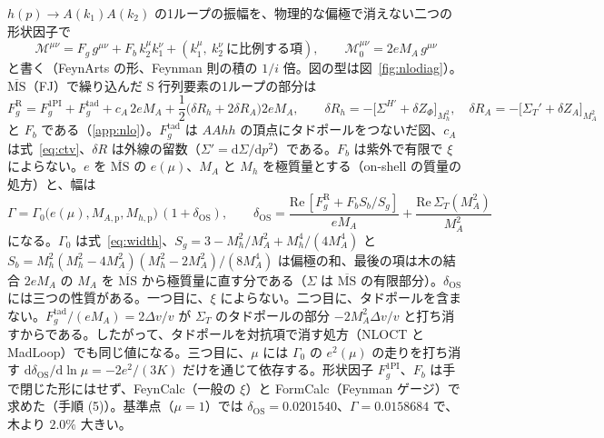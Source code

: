 \documentclass[a4paper,10pt]{ltjsarticle}
\newcommand{\dd}{\mathrm{d}}
\newcommand{\MSbar}{\overline{\mathrm{MS}}}
\newcommand{\re}{\mathrm{Re}\,}
\begin{document}
$h(p)\to A(k_1)A(k_2)$ の1ループの振幅を、物理的な偏極で消えない二つの形状因子で
\begin{equation}
\mathcal M^{\mu\nu}=F_g\,g^{\mu\nu}+F_b\,k_2^\mu k_1^\nu+(k_1^\mu,\ k_2^\nu\ \text{に比例する項}),\qquad
\mathcal M_0^{\mu\nu}=2eM_A\,g^{\mu\nu}
\label{eq:ff}
\end{equation}
と書く（FeynArts の形、Feynman 則の積の $1/i$ 倍。図の型は図~\ref{fig:nlodiag}）。$\MSbar$（FJ）で繰り込んだ S 行列要素の1ループの部分は
\begin{equation}
F_g^{\mathrm R}=F_g^{\mathrm{1PI}}+F_g^{\mathrm{tad}}+c_A\,2eM_A+\frac12\bigl(\delta R_h+2\delta R_A\bigr)2eM_A,\qquad
\delta R_h=-\bigl[\Sigma^{H\prime}+\delta Z_\Phi\bigr]_{M_h^2},\quad \delta R_A=-\bigl[\Sigma_T'+\delta Z_A\bigr]_{M_A^2}
\label{eq:nloamp}
\end{equation}
と $F_b$ である（\ref{app:nlo}）。$F_g^{\mathrm{tad}}$ は $AAhh$ の頂点にタドポールをつないだ図、$c_A$ は式~\eqref{eq:ctv}、$\delta R$ は外線の留数（$\Sigma'=\dd\Sigma/\dd p^2$）である。$F_b$ は紫外で有限で $\xi$ によらない。$e$ を $\MSbar$ の $e(\mu)$、$M_A$ と $M_h$ を極質量とする（on-shell の質量の処方）と、幅は
\begin{equation}
\Gamma=\Gamma_0\bigl(e(\mu),M_{A,\mathrm p},M_{h,\mathrm p}\bigr)\,(1+\delta_{\mathrm{OS}}),\qquad
\delta_{\mathrm{OS}}=\frac{\re[F_g^{\mathrm R}+F_bS_b/S_g]}{eM_A}+\frac{\re\Sigma_T(M_A^2)}{M_A^2}
\label{eq:nlowidth}
\end{equation}
になる。$\Gamma_0$ は式~\eqref{eq:width}、$S_g=3-M_h^2/M_A^2+M_h^4/(4M_A^4)$ と $S_b=M_h^2(M_h^2-4M_A^2)(M_h^2-2M_A^2)/(8M_A^4)$ は偏極の和、最後の項は木の結合 $2eM_A$ の $M_A$ を $\MSbar$ から極質量に直す分である（$\Sigma$ は $\MSbar$ の有限部分）。$\delta_{\mathrm{OS}}$ には三つの性質がある。一つ目に、$\xi$ によらない。二つ目に、タドポールを含まない。$F_g^{\mathrm{tad}}/(eM_A)=2\Delta v/v$ が $\Sigma_T$ のタドポールの部分 $-2M_A^2\Delta v/v$ と打ち消すからである。したがって、タドポールを対抗項で消す処方（NLOCT と MadLoop）でも同じ値になる。三つ目に、$\mu$ には $\Gamma_0$ の $e^2(\mu)$ の走りを打ち消す $\dd\delta_{\mathrm{OS}}/\dd\ln\mu=-2e^2/(3K)$ だけを通じて依存する。形状因子 $F_g^{\mathrm{1PI}}$、$F_b$ は手で閉じた形にはせず、FeynCalc（一般の $\xi$）と FormCalc（Feynman ゲージ）で求めた（手順 (5)）。基準点（$\mu=1$）では $\delta_{\mathrm{OS}}=0.0201540$、$\Gamma=0.0158684$ で、木より $2.0\%$ 大きい。
\end{document}
